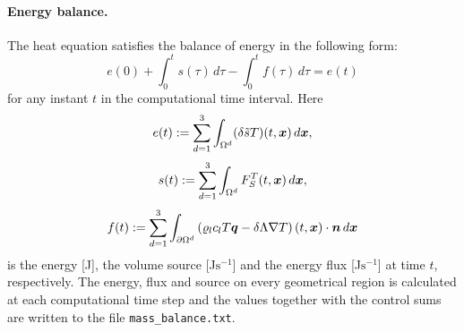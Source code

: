 \paragraph{Energy balance.}
The heat equation satisfies the balance of energy in the following form:
$$ e(0) + \int_0^t s(\tau) \,d\tau - \int_0^t f(\tau) \,d\tau = e(t) $$
for any instant $t$ in the computational time interval.
Here
$$ e(t) := \sum_{d=1}^3\int_{\Omega^d}(\delta \tilde s T)(t,\mathbf{\boldsymbol{x}})\,d\mathbf{\boldsymbol{x}}, $$
$$ s(t) := \sum_{d=1}^3\int_{\Omega^d}F_S^T(t,\mathbf{\boldsymbol{x}})\,d\mathbf{\boldsymbol{x}}, $$
$$ f(t) := \sum_{d=1}^3\int_{\partial\Omega^d}\left(\varrho_l c_l T\mathbf{\boldsymbol{q}} - \delta\Lambda\nabla T\right)(t,\mathbf{\boldsymbol{x}})\cdot\mathbf{\boldsymbol{n}} \,d\mathbf{\boldsymbol{x}} $$
is the energy [J], the volume source [J$\mathrm{s}^{-1}$] and the energy flux [J$\mathrm{s}^{-1}$] at time $t$, respectively.
The energy, flux and source on every geometrical region is calculated at each computational time step and the values together with the control sums are written to the file \texttt{mass\_balance.txt}.





